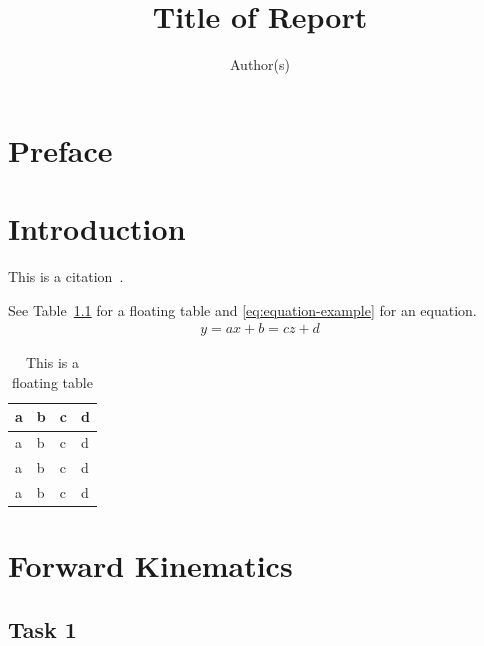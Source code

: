\documentclass{tpk4170report}
\title{Title of Report}
\author{Author(s)}
\begin{document}
\maketitle

\frontmatter

\chapter*{Preface}

\tableofcontents
\listoffigures
\listoftables

\mainmatter








\chapter{Introduction}
\label{chap:Introduction}

\blindmathtrue
\blindtext

This is a citation~\cite{McCarthy2011}. \blindtext

See Table~\ref{table:floating-table} for a floating table and
\eqref{eq:equation-example} for an equation.
\begin{align}
  \label{eq:equation-example}
  y = ax + b 
    = cz + d 
\end{align}

\begin{table}
  \centering
  \begin{tabular}{l|lll}
    a& b& c &d \\
    \hline
    a& b& c &d \\
    a& b& c &d \\
    a& b& c &d
  \end{tabular}
  \caption{This is a floating table}
  \label{table:floating-table}
\end{table}




\chapter{Forward Kinematics}
\section{Task 1}
\end{document}
